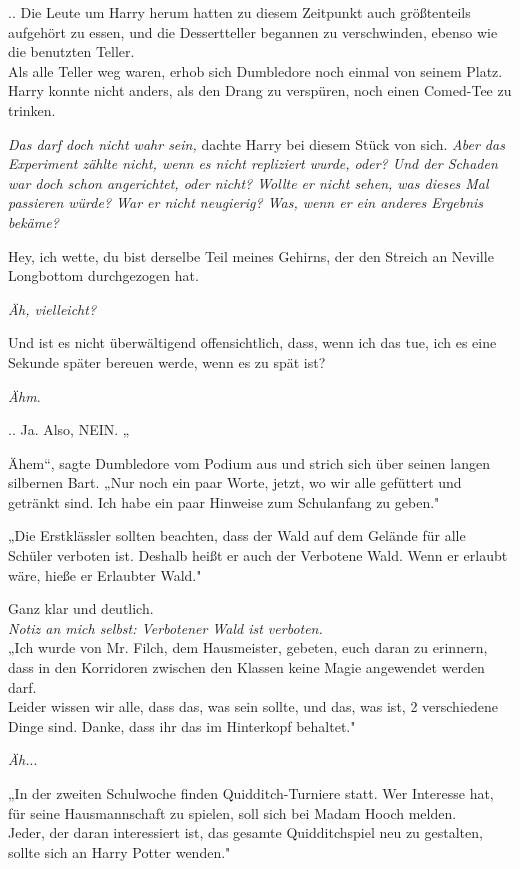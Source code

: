 {.. Die Leute um Harry herum hatten zu diesem Zeitpunkt auch größtenteils aufgehört zu essen, und die Dessertteller begannen zu verschwinden, ebenso wie die benutzten Teller.\\ Als alle Teller weg waren, erhob sich Dumbledore noch einmal von seinem Platz. Harry konnte nicht anders, als den Drang zu verspüren, noch einen Comed-Tee zu trinken.

\emph{Das darf doch nicht wahr sein,} dachte Harry bei diesem Stück von sich. \emph{Aber das Experiment zählte nicht, wenn es nicht repliziert wurde, oder? Und der Schaden war doch schon angerichtet, oder nicht? Wollte er nicht sehen, was dieses Mal passieren würde? War er nicht neugierig? Was, wenn er ein anderes Ergebnis bekäme?}

Hey, ich wette, du bist derselbe Teil meines Gehirns, der den Streich an Neville Longbottom durchgezogen hat.

\emph{Äh, vielleicht?}

Und ist es nicht überwältigend offensichtlich, dass, wenn ich das tue, ich es eine Sekunde später bereuen werde, wenn es zu spät ist?

\emph{Ähm}.

.. Ja. Also, NEIN. „

Ähem“, sagte Dumbledore vom Podium aus und strich sich über seinen langen silbernen Bart. „Nur noch ein paar Worte, jetzt, wo wir alle gefüttert und getränkt sind. Ich habe ein paar Hinweise zum Schulanfang zu geben."

„Die Erstklässler sollten beachten, dass der Wald auf dem Gelände für alle Schüler verboten ist. Deshalb heißt er auch der Verbotene Wald. Wenn er erlaubt wäre, hieße er Erlaubter Wald."

Ganz klar und deutlich.\\ \emph{Notiz an mich selbst: Verbotener Wald ist verboten.}\\ „Ich wurde von Mr. Filch, dem Hausmeister, gebeten, euch daran zu erinnern, dass in den Korridoren zwischen den Klassen keine Magie angewendet werden darf.\\ Leider wissen wir alle, dass das, was sein sollte, und das, was ist, 2 verschiedene Dinge sind. Danke, dass ihr das im Hinterkopf behaltet."

\emph{Äh.}..

„In der zweiten Schulwoche finden Quidditch-Turniere statt. Wer Interesse hat, für seine Hausmannschaft zu spielen, soll sich bei Madam Hooch melden.\\ Jeder, der daran interessiert ist, das gesamte Quidditchspiel neu zu gestalten, sollte sich an Harry Potter wenden."

}
